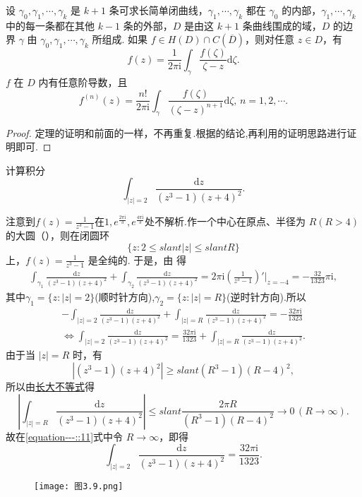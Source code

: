 \documentclass[../../main.tex]{subfiles}
\begin{document}
\begin{theorem}\label{theorem:定理3.4.6}
设 \( \gamma_0, \gamma_1, \cdots, \gamma_k \) 是 \( k + 1 \) 条可求长简单闭曲线，\( \gamma_1, \cdots, \gamma_k \) 都在 \( \gamma_0 \) 的内部，\( \gamma_1, \cdots, \gamma_k \) 中的每一条都在其他 \( k - 1 \) 条的外部，\( D \) 是由这 \( k + 1 \) 条曲线围成的域，\( D \) 的边界 \( \gamma \) 由 \( \gamma_0, \gamma_1, \cdots, \gamma_k \) 所组成. 如果 \( f \in H(D) \cap C(\overline{D}) \)，则对任意 \( z \in D \)，有
\[
f(z) = \frac{1}{2\pi \mathrm{i}} \int_{\gamma} \frac{f(\zeta)}{\zeta - z} \mathrm{d}\zeta.
\]
\( f \) 在 \( D \) 内有任意阶导数，且
\[
f^{(n)}(z) = \frac{n!}{2\pi \mathrm{i}} \int_{\gamma} \frac{f(\zeta)}{(\zeta - z)^{n + 1}} \mathrm{d}\zeta, \, n = 1, 2, \cdots.
\]
\end{theorem}
\begin{proof}
定理的证明和前面的一样，不再重复.根据的结论,再利用的证明思路进行证明即可.
\end{proof}

\begin{example}
计算积分
\[
\int_{|z| = 2} \frac{\mathrm{d}z}{(z^3 - 1)(z + 4)^2}.
\]
\end{example}
\begin{solution}
注意到\( f(z) = \frac{1}{z^3 - 1} \)在$1,e^{\frac{2\pi \mathrm{i}}{3}},e^{\frac{4\pi \mathrm{i}}{3}}$处不解析.作一个中心在原点、半径为 \( R(R > 4) \) 的大圆（），则在闭圆环
\[
\{z: 2 \leqslant slant |z| \leqslant slant R\}
\]
上，\( f(z) = \frac{1}{z^3 - 1} \) 是全纯的. 于是，由 得
\begin{align*}
\int_{\gamma_1} \frac{\mathrm{d}z}{(z^3 - 1)(z + 4)^2} + \int_{\gamma_2} \frac{\mathrm{d}z}{(z^3 - 1)(z + 4)^2} 
= 2\pi \mathrm{i} \left( \frac{1}{z^3 - 1} \right)' \bigg|_{z = -4} = -\frac{32}{1323}\pi \mathrm{i},
\end{align*}
其中$\gamma_1=\{z:|z|=2\}$(顺时针方向),$\gamma_2=\{z:|z|=R\}$(逆时针方向).所以
\begin{align}
-\int_{|z|=2}{\frac{\mathrm{d}z}{(z^3-1)(z+4)^2}}+\int_{|z|=R}{\frac{\mathrm{d}z}{(z^3-1)(z+4)^2}}=-\frac{32\pi \mathrm{i}}{1323} \nonumber
\\
\Longleftrightarrow \int_{|z|=2}{\frac{\mathrm{d}z}{(z^3-1)(z+4)^2}}=\frac{32\pi \mathrm{i}}{1323}+\int_{|z|=R}{\frac{\mathrm{d}z}{(z^3-1)(z+4)^2}}.\label{equation---::11}
\end{align}
由于当 \( |z| = R \) 时，有
\[
|(z^3 - 1)(z + 4)^2| \geqslant slant (R^3 - 1)(R - 4)^2,
\]
所以由\hyperref[proposition:长大不等式]{长大不等式}得
\[
\left| \int_{|z| = R} \frac{\mathrm{d}z}{(z^3 - 1)(z + 4)^2} \right| \leqslant slant \frac{2\pi R}{(R^3 - 1)(R - 4)^2} \to 0 \, (R \to \infty).
\]
故在\eqref{equation---::11}式中令 \( R \to \infty \)，即得
\[
\int_{|z| = 2} \frac{\mathrm{d}z}{(z^3 - 1)(z + 4)^2} = \frac{32\pi \mathrm{i}}{1323}.
\]
\begin{figure}[H]
\centering
\texttt{[image: 图3.9.png]}
\caption{}
\label{figure:图3.9}
\end{figure}
\end{solution}
\end{document}
